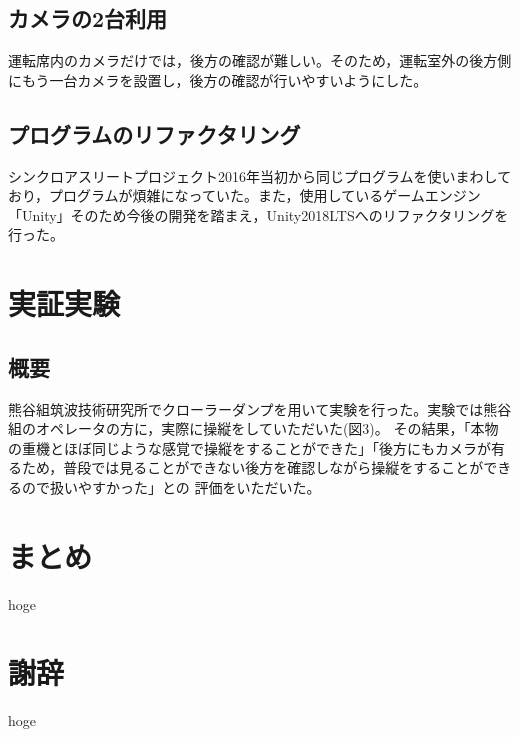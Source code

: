 \documentclass[a4paper,12pt]{jsarticle}
\begin{document}
\subsection{カメラの2台利用}
運転席内のカメラだけでは，後方の確認が難しい。そのため，運転室外の後方側にもう一台カメラを設置し，後方の確認が行いやすいようにした。

\subsection{プログラムのリファクタリング}
シンクロアスリートプロジェクト2016年当初から同じプログラムを使いまわしており，プログラムが煩雑になっていた。また，使用しているゲームエンジン「Unity」そのため今後の開発を踏まえ，Unity2018LTSへのリファクタリングを行った。

\clearpage

\section{実証実験}
\subsection{概要}
熊谷組筑波技術研究所でクローラーダンプを用いて実験を行った。実験では熊谷組のオペレータの方に，実際に操縦をしていただいた(図3)。 その結果，「本物の重機とほぼ同じような感覚で操縦をすることができた」「後方にもカメラが有るため，普段では見ることができない後方を確認しながら操縦をすることができるので扱いやすかった」との 評価をいただいた。

\clearpage

\section{まとめ}
hoge

\clearpage

\section*{謝辞} %
hoge

\clearpage
\end{document}
